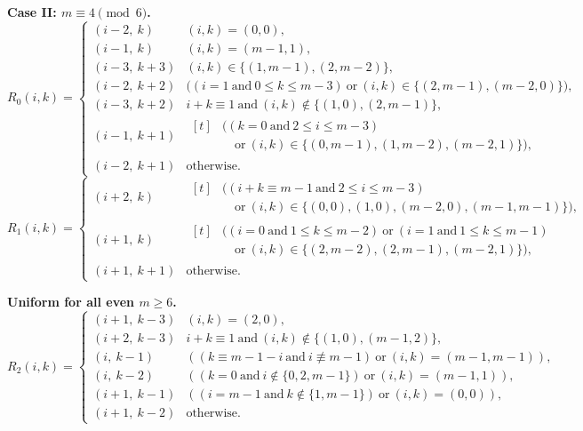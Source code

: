 \documentclass[11pt]{article}
\begin{document}
\medskip
\noindent\textbf{Case II: $m\equiv 4\pmod 6$.}
\[
R_0(i,k)=
\begin{cases}
(i-2,\ k) & (i,k)=(0,0),\\
(i-1,\ k) & (i,k)=(m-1,1),\\
(i-3,\ k+3) & (i,k)\in\{(1,m-1),(2,m-2)\},\\
(i-2,\ k+2) & \bigl( (i=1\ \text{and}\ 0\le k\le m-3)\ \text{or}\ (i,k)\in\{(2,m-1),(m-2,0)\} \bigr),\\
(i-3,\ k+2) & i+k\equiv 1\ \text{and}\ (i,k)\notin\{(1,0),(2,m-1)\},\\
(i-1,\ k+1) & \begin{aligned}[t]
              &\bigl( (k=0\ \text{and}\ 2\le i\le m-3)\\
              &\quad\text{or}\ (i,k)\in\{(0,m-1),(1,m-2),(m-2,1)\} \bigr),
              \end{aligned}\\[2.5ex]
(i-2,\ k+1) & \text{otherwise.}
\end{cases}
\]
\[
R_1(i,k)=
\begin{cases}
(i+2,\ k) & \begin{aligned}[t]
            &\bigl( (i+k\equiv m-1\ \text{and}\ 2\le i\le m-3)\\
            &\quad\text{or}\ (i,k)\in\{(0,0),(1,0),(m-2,0),(m-1,m-1)\} \bigr),
            \end{aligned}\\[2.5ex]
(i+1,\ k) & \begin{aligned}[t]
            &\bigl( (i=0\ \text{and}\ 1\le k\le m-2)\ \text{or}\ (i=1\ \text{and}\ 1\le k\le m-1)\\
            &\quad\text{or}\ (i,k)\in\{(2,m-2),(2,m-1),(m-2,1)\} \bigr),
            \end{aligned}\\[2.5ex]
(i+1,\ k+1) & \text{otherwise.}
\end{cases}
\]

\medskip
\noindent\textbf{Uniform for all even $m\ge 6$.}
\[
R_2(i,k)=
\begin{cases}
(i+1,\ k-3) & (i,k)=(2,0),\\
(i+2,\ k-3) & i+k\equiv 1\ \text{and}\ (i,k)\notin\{(1,0),(m-1,2)\},\\
(i,\ k-1) & ((k\equiv m-1-i\ \text{and}\ i\not\equiv m-1)\ \text{or}\ (i,k)=(m-1,m-1)),\\
(i,\ k-2) & ((k=0\ \text{and}\ i\notin\{0,2,m-1\})\ \text{or}\ (i,k)=(m-1,1)),\\
(i+1,\ k-1) & ((i=m-1\ \text{and}\ k\notin\{1,m-1\})\ \text{or}\ (i,k)=(0,0)),\\
(i+1,\ k-2) & \text{otherwise.}
\end{cases}
\]
\end{document}
